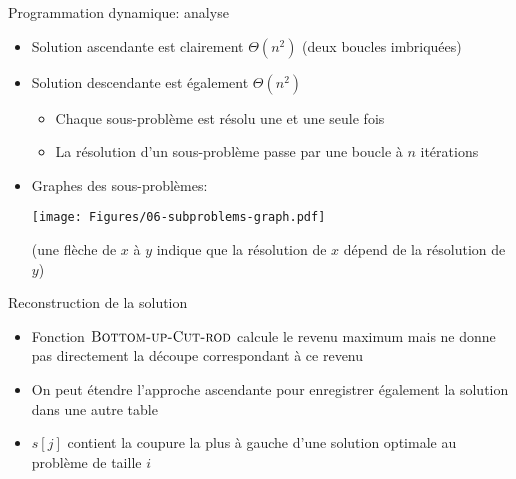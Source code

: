\begin{frame}{Programmation dynamique: analyse}

\begin{itemize}
\item Solution ascendante est clairement $\Theta(n^2)$ (deux boucles imbriquées)
\item Solution descendante est également $\Theta(n^2)$
\begin{itemize}
\item Chaque sous-problème est résolu une et une seule fois
\item La résolution d'un sous-problème passe par une boucle à $n$ itérations
\end{itemize}
\item Graphes des sous-problèmes:

\centerline{\texttt{[image: Figures/06-subproblems-graph.pdf]}}

(une flèche de $x$ à $y$ indique que la résolution de $x$ dépend de la résolution de $y$)
\end{itemize}


\end{frame}

\begin{frame}{Reconstruction de la solution}
\begin{itemize}
\item Fonction $\textnormal{\scshape Bottom-up-Cut-rod}$ calcule le revenu maximum mais ne donne pas directement la découpe correspondant à ce revenu
\item On peut étendre l'approche ascendante pour enregistrer également la solution dans une autre table
\end{itemize}

\begin{center}
{\footnotesize
{}
}
\end{center}

\begin{itemize}
\item $s[j]$ contient la coupure la plus à gauche d'une solution optimale au problème de taille $i$
\end{itemize}
\end{frame}

